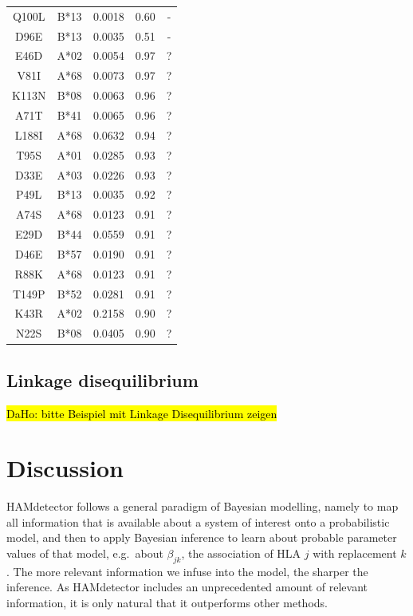 \documentclass{bioinfo}
\begin{document}
\begin{table}[h!]
\begin{tabular}{c|c|c|c|c}
  Q100L       & B*13 & 0.0018                        & 0.60                                & -                        \\
  D96E        & B*13 & 0.0035                        & 0.51                                & -  \\\hline
  E46D & A*02 & 0.0054 & 0.97 & ? \\
  V81I & A*68 & 0.0073 & 0.97 & ? \\
  K113N & B*08 & 0.0063 & 0.96 & ? \\
  A71T & B*41 & 0.0065 & 0.96 & ? \\
  L188I & A*68 & 0.0632 & 0.94 & ? \\
  T95S & A*01 & 0.0285 & 0.93 & ? \\
  D33E & A*03 & 0.0226 & 0.93 & ? \\
  P49L & B*13 & 0.0035 & 0.92 & ? \\
  A74S & A*68 & 0.0123 & 0.91 & ? \\
  E29D & B*44 & 0.0559 & 0.91 & ? \\
  D46E & B*57 & 0.0190 & 0.91 & ? \\
  R88K & A*68 & 0.0123 & 0.91 & ? \\
  T149P & B*52 & 0.0281 & 0.91 & ? \\
  K43R & A*02 & 0.2158 & 0.90 & ? \\
  N22S & B*08 & 0.0405 & 0.90 & ? \\
  \end{tabular}
  \label{tab:false-positives}
 \end{table}

 \subsection{Linkage disequilibrium}
 
 \hl{DaHo: bitte Beispiel mit Linkage Disequilibrium zeigen}

\section{Discussion}

HAMdetector follows a general paradigm of Bayesian modelling, namely to map all information that is available about a system of interest onto a probabilistic model, and then to apply Bayesian inference to learn about probable parameter values of that model, e.g.\ about $\beta_{jk}$, the association of HLA $j$ with replacement $k$. The more relevant information we infuse into the model, the sharper the inference. As HAMdetector includes an unprecedented amount of relevant information, it is only natural that it outperforms other methods.
\end{document}
